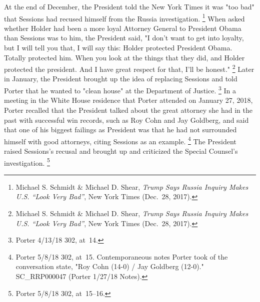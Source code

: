 {At the end of December, the President told the New York Times it was "too bad" that Sessions had recused himself from the Russia investigation.%
\footnote{Michael S. Schmidt \& Michael D. Shear, \textit{Trump Says Russia Inquiry Makes U.S. ``Look Very Bad''}, New York Times (Dec.~28, 2017).}
When asked whether Holder had been a more loyal Attorney General to President Obama than Sessions was to him, the President said, "I don't want to get into loyalty, but I will tell you that, I will say this: Holder protected President Obama.
Totally protected him.
When you look at the things that they did, and Holder protected the president.
And I have great respect for that, I'll be honest."%
\footnote{Michael S. Schmidt \& Michael D. Shear, \textit{Trump Says Russia Inquiry Makes U.S. ``Look Very Bad''}, New York Times (Dec.~28, 2017).}
Later in January, the President brought up the idea of replacing Sessions and told Porter that he wanted to "clean house" at the Department of Justice.%
\footnote{Porter 4/13/18 302, at~14.}
In a meeting in the White House residence that Porter attended on January 27, 2018, Porter recalled that the President talked about the great attorney she had in the past with successful win records, such as Roy Cohn and Jay Goldberg, and said that one of his biggest failings as President was that he had not surrounded himself with good attorneys, citing Sessions as an example.%
\footnote{Porter 5/8/18 302, at~15.
Contemporaneous notes Porter took of the conversation state, "Roy Cohn (14-0) / Jay Goldberg (12-0)."
SC\_RRP000047 (Porter 1/27/18 Notes).}
The President raised Sessions's recusal and brought up and criticized the Special Counsel's investigation.%
\footnote{Porter 5/8/18 302, at~15--16.}

}

